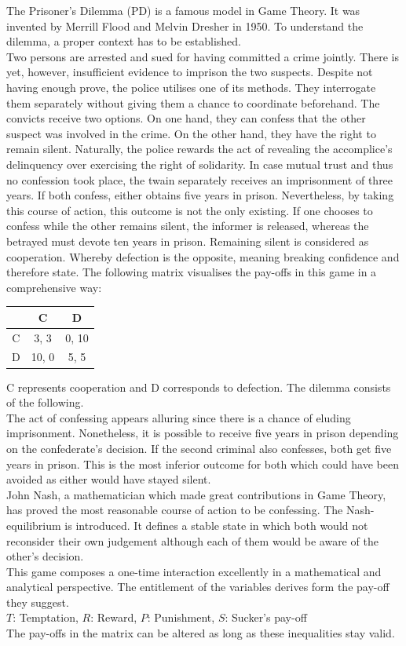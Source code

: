 \documentclass{article}
\begin{document}
The Prisoner's Dilemma (PD) is a famous model in Game Theory. 
It was invented by Merrill Flood and Melvin Dresher in 1950. 
To understand the dilemma, a proper context has to be established.\\
Two persons are arrested and sued for having committed a crime jointly.
There is yet, however, insufficient evidence to imprison the two suspects.
Despite not having enough prove, the police utilises one of its methods.
They interrogate them separately without giving them a chance to coordinate beforehand.
The convicts receive two options.
On one hand, they can confess that the other suspect was involved in the crime. 
On the other hand, they have the right to remain silent.
Naturally, the police rewards the act of revealing the accomplice's delinquency over exercising the right of solidarity.
In case mutual trust and thus no confession took place, the twain separately receives an imprisonment of three years.
If both confess, either obtains five years in prison.
Nevertheless, by taking this course of action, this outcome is not the only existing.
If one chooses to confess while the other remains silent, the informer is released, whereas the betrayed must devote ten years in prison.
Remaining silent is considered as cooperation.
Whereby defection is the opposite, meaning breaking confidence and therefore state.
The following matrix visualises the pay-offs in this game in a comprehensive way:

\begin{center}
\begin{tabular}{ c|c|c }
   & C & D \\ 
   \hline
 C & 3, 3 & 0, 10\\  
   \hline
 D & 10, 0 & 5, 5
\end{tabular}
\end{center}

\noindent
C represents cooperation and D corresponds to defection. 
The dilemma consists of the following.\\
The act of confessing appears alluring since there is a chance of eluding imprisonment.
Nonetheless, it is possible to receive five years in prison depending on the confederate's decision.
If the second criminal also confesses, both get five years in prison. 
This is the most inferior outcome for both which could have been avoided as either would have stayed silent.\\
John Nash, a mathematician which made great contributions in Game Theory, has proved the most reasonable course of action to be confessing.
The Nash-equilibrium is introduced. 
It defines a stable state in which both would not reconsider their own judgement although each of them would be aware of the other's decision.\\
This game composes a one-time interaction excellently in a mathematical and analytical perspective. 
The entitlement of the variables derives form the pay-off they suggest.\\
$T$: Temptation,
$R$: Reward,
$P$: Punishment,
$S$: Sucker's pay-off\\
The pay-offs in the matrix can be altered as long as these inequalities stay valid.
\end{document}
